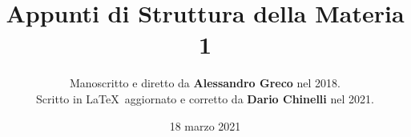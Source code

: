 \documentclass[11pt]{article}
\begin{document}
\title{\textbf{Appunti di Struttura della Materia 1}} 

\author{Manoscritto e diretto da \textbf{Alessandro Greco} nel 2018. \\
Scritto in \LaTeX\ aggiornato e corretto da \textbf{Dario Chinelli} nel 2021.}

\date{18 marzo 2021}

\maketitle

    \newpage

    \tableofcontents

    
\iffalse
    

    

    

    

    

    

    
\fi
    

    

    
    
    
\iffalse
    
    
    
    
    
    
    
    
    
    
    
    
    
    
    
    
    
    
    
\fi
\end{document}
